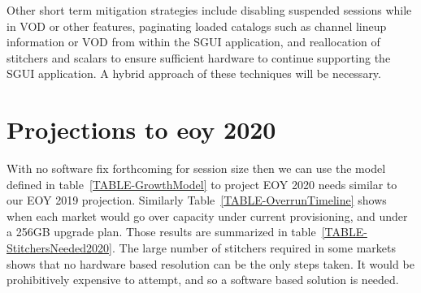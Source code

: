 \documentclass{article}
\begin{document}
Other short term mitigation strategies include disabling suspended sessions while in VOD or other features, paginating loaded catalogs such as channel lineup information or VOD from within the SGUI application, and reallocation of stitchers and scalars to ensure sufficient hardware to continue supporting the SGUI application. A hybrid approach of these techniques will be necessary. 

\section{Projections to eoy 2020}
\label{SECTION-2020Proj}

With no software fix forthcoming for session size then we can use the model defined in table~\ref{TABLE-GrowthModel} to project EOY 2020 needs similar to our EOY 2019 projection. Similarly Table~\ref{TABLE-OverrunTimeline} shows when each market would go over capacity under current provisioning, and under a 256GB upgrade plan. Those results are summarized in table~\ref{TABLE-StitchersNeeded2020}. The large number of stitchers required in some markets shows that no hardware based resolution can be the only steps taken. It would be prohibitively expensive to attempt, and so a software based solution is needed. 
\end{document}
